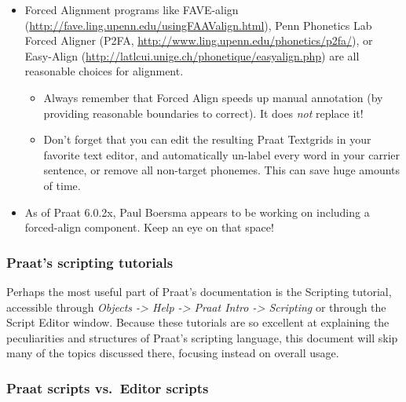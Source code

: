 \begin{itemize}
  \begin{itemize}
  \tightlist
  \item
    Forced Alignment programs like FAVE-align
    (\url{http://fave.ling.upenn.edu/usingFAAValign.html}), Penn
    Phonetics Lab Forced Aligner (P2FA,
    \url{http://www.ling.upenn.edu/phonetics/p2fa/}), or Easy-Align
    (\url{http://latlcui.unige.ch/phonetique/easyalign.php}) are all
    reasonable choices for alignment.

    \begin{itemize}
    \tightlist
    \item
      Always remember that Forced Align speeds up manual annotation (by
      providing reasonable boundaries to correct). It does \emph{not}
      replace it!
    \item
      Don't forget that you can edit the resulting Praat Textgrids in
      your favorite text editor, and automatically un-label every word
      in your carrier sentence, or remove all non-target phonemes. This
      can save huge amounts of time.
    \end{itemize}
  \item
    As of Praat 6.0.2x, Paul Boersma appears to be working on including
    a forced-align component. Keep an eye on that space!
  \end{itemize}
\end{itemize}

\hypertarget{praats-scripting-tutorials}{%
\subsubsection{Praat's scripting
tutorials}\label{praats-scripting-tutorials}}

Perhaps the most useful part of Praat's documentation is the Scripting
tutorial, accessible through \emph{Objects -\textgreater{} Help
-\textgreater{} Praat Intro -\textgreater{} Scripting} or through the
Script Editor window. Because these tutorials are so excellent at
explaining the peculiarities and structures of Praat's scripting
language, this document will skip many of the topics discussed there,
focusing instead on overall usage.

\hypertarget{praat-scripts-vs.-editor-scripts}{%
\subsubsection{Praat scripts vs.~Editor
scripts}\label{praat-scripts-vs.-editor-scripts}}


